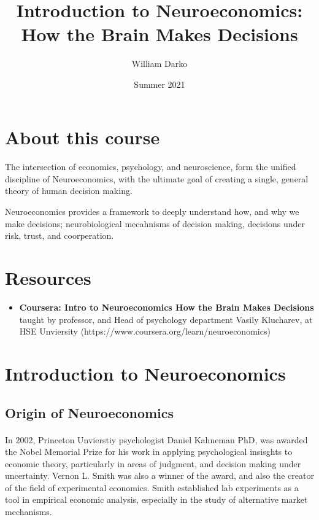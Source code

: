 \documentclass[12pt, a4paper]{article}
\title{Introduction to Neuroeconomics: How the Brain Makes Decisions}
\author{William Darko}
\date{Summer 2021}
\begin{document}
\maketitle
\newpage

\tableofcontents

\newpage

\section{About this course}
\paragraph*{}
The intersection of economics, psychology, and neuroscience, form the unified discipline of
Neuroeconomics, with the ultimate goal of creating a single, general theory of human decision making.

Neuroeconomics provides a framework to deeply understand how, and why we make decisions;
neurobiological mecahnisms of decision making, decisions under risk, trust, and coorperation.


\newpage

\section{Resources}

\begin{itemize}
    \item \textbf{Coursera: Intro to Neuroeconomics How the Brain Makes Decisions} 
    taught by professor, and Head of psychology department Vasily Klucharev, at HSE Unviersity 
    (https://www.coursera.org/learn/neuroeconomics)
\end{itemize}

\newpage

\section{Introduction to Neuroeconomics}

\subsection{Origin of Neuroeconomics}

\paragraph*{}
In 2002, Princeton Unvierstiy psychologist Daniel Kahneman PhD, was awarded
the Nobel Memorial Prize for his work in applying psychological insisghts to
economic theory, particularly in areas of judgment, and decision making under 
uncertainty. Vernon L. Smith was also a winner of the award, and also the creator
of the field of experimental economics. Smith established lab experiments as a tool
in empirical economic analysis, especially in the study of alternative market
mechanisms.
\end{document}
